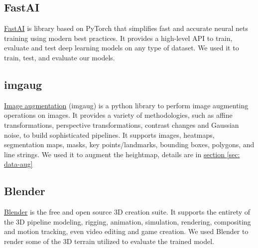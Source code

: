 \documentclass[../document.tex]{subfiles}
\begin{document}
\subsection{FastAI}
\href{https://course.fast.ai/}{FastAI} is library based on PyTorch that simplifies fast and accurate neural nets training using modern best practices. It provides a high-level API to train, evaluate and test deep learning models on any type of dataset. We used it to train, test, and evaluate our models.

\subsection{imgaug}
\href{https://imgaug.readthedocs.io/en/latest/}{Image augmentation} (imgaug) is a python library to perform image augmenting operations on images. It provides a variety of methodologies, such as affine transformations, perspective transformations, contrast changes and Gaussian noise, to build sophisticated pipelines. It supports images,  heatmaps, segmentation maps, masks, key points/landmarks, bounding boxes, polygons, and line strings. We used it to augment the heightmap, details are in \hyperref[sec: data-aug]{section \ref{sec: data-aug}}

\subsection{Blender}
\href{https://www.blender.org/}{Blender} is the free and open source 3D creation suite. It supports the entirety of the 3D pipeline modeling, rigging, animation, simulation, rendering, compositing and motion tracking, even video editing and game creation. We used Blender to render some of the 3D terrain utilized to evaluate the trained model.

\end{document}
